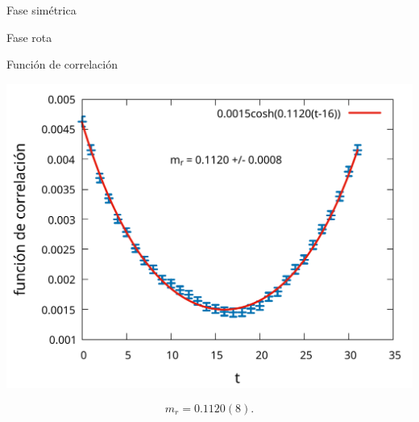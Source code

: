 \documentclass[11pt]{beamer}
\begin{document}
\begin{frame}{Fase simétrica}
\end{frame}

\begin{frame}{Fase rota}
\end{frame}

\begin{frame}{Función de correlación}
\begin{center}
\includegraphics[scale=0.3]{figures/correlation_function.pdf}
\end{center}

$$ m_r = 0.1120(8). $$
\end{frame}
\end{document}
